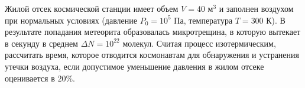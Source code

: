 
Жилой отсек космической станции имеет объем $V=40$ м$^3$ и заполнен воздухом при нормальных условиях (давление $P_0=10^5$ Па, температура $T=300$ К). 
В результате попадания метеорита образовалась микротрещина, в которую вытекает в секунду в среднем $\Delta N=10^{22}$ молекул. Считая процесс изотермическим, 
рассчитать время, которое отводится космонавтам для обнаружения и устранения утечки воздуха, если допустимое уменьшение давления в жилом отсеке оценивается в $20\%$. 